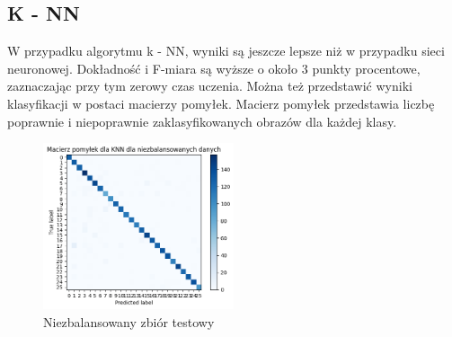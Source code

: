 \subsection{K - NN}\label{subsec:testowanie_knn}
\begin{table}[H]
    \centering
    \caption{Dokładność i F-miara dla zbioru testowego dla k = 3}
    \label{tab:acc_f_measure_knn}
\end{table}
W przypadku algorytmu k - NN, wyniki są jeszcze lepsze niż w przypadku sieci neuronowej. Dokładność i F-miara są wyższe o około 3 punkty procentowe,
zaznaczając przy tym zerowy czas uczenia. Można też przedstawić wyniki klasyfikacji w postaci macierzy pomyłek. 
Macierz pomyłek przedstawia liczbę poprawnie i niepoprawnie zaklasyfikowanych obrazów dla każdej klasy.
\begin{figure}[H]
    \centering
    \includegraphics[width=0.5\textwidth]{img/confusion_not_balanced.png}
    \caption{Niezbalansowany zbiór testowy}
    \label{fig:confusion_matrix_knn_unbalanced}
\end{figure}
